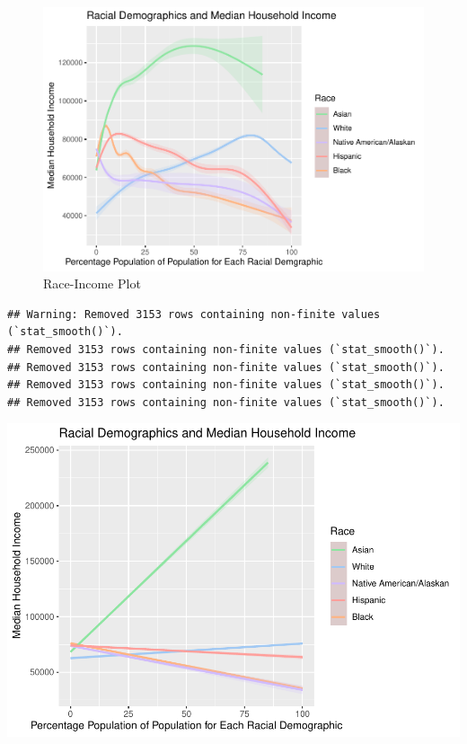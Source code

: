 \documentclass[
  man]{apa6}
\begin{document}
\begin{figure}
\centering
\includegraphics{Zip_Analysis_files/figure-latex/Smooth-Plot-Income-Race-1.pdf}
\caption{\label{fig:Smooth-Plot-Income-Race}Race-Income Plot}
\end{figure}

\begin{verbatim}
## Warning: Removed 3153 rows containing non-finite values (`stat_smooth()`).
## Removed 3153 rows containing non-finite values (`stat_smooth()`).
## Removed 3153 rows containing non-finite values (`stat_smooth()`).
## Removed 3153 rows containing non-finite values (`stat_smooth()`).
## Removed 3153 rows containing non-finite values (`stat_smooth()`).
\end{verbatim}

\includegraphics{Zip_Analysis_files/figure-latex/lm-plot-1.pdf}
\end{document}
